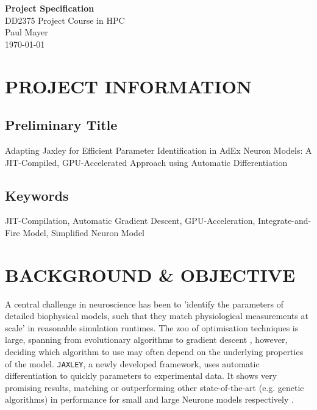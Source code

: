 \documentclass[11pt,a4paper]{article}
\begin{document}
\begin{center}
    \LARGE\textbf{Project Specification} \\
    \vspace{0.5cm}
    \large DD2375 Project Course in HPC \\
    \vspace{0.3cm}
    \normalsize Paul Mayer \\
    \today
\end{center}

\vspace{1cm}

\section{PROJECT INFORMATION}

\subsection*{Preliminary Title}
Adapting Jaxley for Efficient Parameter Identification in AdEx Neuron Models: A JIT-Compiled, GPU-Accelerated Approach using Automatic Differentiation

\subsection*{Keywords}
JIT-Compilation, Automatic Gradient Descent, GPU-Acceleration, Integrate-and-Fire Model, Simplified Neuron Model

\section{BACKGROUND \& OBJECTIVE}
A central challenge in neuroscience has been to 'identify the parameters of detailed biophysical models, such that they match physiological measurements at scale' \cite{Deistler2024} in reasonable simulation runtimes.
The zoo of optimisation techniques is large, spanning from evolutionary algorithms \cite{VanGeit2008} to gradient descent \cite{Jones2024}, however, deciding which algorithm to use may often depend on the underlying properties of the model.
\verb|JAXLEY|, a newly developed framework, uses automatic differentiation to quickly parameters to experimental data.
It shows very promising results, matching or outperforming other state-of-the-art (e.g. genetic algorithms) in performance for small and large Neurone models respectively \cite{Deistler2024}.
\end{document}
